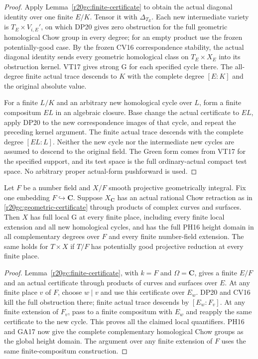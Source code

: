 \begin{proof}
Apply Lemma~\ref{r20gc:finite-certificate} to obtain the actual
diagonal identity over one finite $E/K$.  Tensor it with
$\Delta_{T_E}$.  Each new intermediate variety is
$T_E\times V_{i,E}'$, on which DP20 gives zero obstruction
for the full geometric homological Chow group in every
degree; for an empty product use the frozen potentially-good
case.  By the frozen CV16 correspondence stability, the
actual diagonal identity sends every geometric homological
class on $T_E\times X_E$ into its obstruction kernel.
VT17 gives strong G for each specified cycle there.
The all-degree finite actual trace descends to $K$ with
the complete degree $[E:K]$ and the original absolute value.

For a finite $L/K$ and an arbitrary new homological cycle
over $L$, form a finite compositum $EL$ in an algebraic
closure.  Base change the actual certificate to $EL$,
apply DP20 to the new correspondence images of that cycle,
and repeat the preceding kernel argument.  The finite
actual trace descends with the complete degree $[EL:L]$.
Neither the new cycle nor the intermediate new cycles are
assumed to descend to the original field.  The Green form
comes from VT17 for the specified support, and its test
space is the full ordinary-actual compact test space.
No arbitrary proper actual-form pushforward is used.
\end{proof}

\begin{theorem}
\label{r20gc:global}
Let $F$ be a number field and $X/F$ smooth projective
geometrically integral.  Fix one embedding $F\hookrightarrow
\mathbf C$.  Suppose $X_{\mathbf C}$ has an actual rational
Chow retraction as in \eqref{r20gc:geometric-certificate}
through products of complex curves and surfaces.
Then $X$ has full local G at every finite place, including
every finite local extension and all new homological cycles,
and has the full PH16 height domain in all complementary
degrees over $F$ and every finite number-field extension.
The same holds for $T\times X$ if $T/F$ has potentially
good projective reduction at every finite place.
\end{theorem}

\begin{proof}
Lemma~\ref{r20gc:finite-certificate}, with $k=F$ and
$\Omega=\mathbf C$, gives a finite $E/F$ and an actual
certificate through products of curves and surfaces over
$E$.  At any finite place $v$ of $F$, choose $w\mid v$
and use this certificate over $E_w$.  DP20 and CV16 kill
the full obstruction there; finite actual trace descends
by $[E_w:F_v]$.  At any finite extension of $F_v$, pass
to a finite compositum with $E_w$ and reapply the same
certificate to the new cycle.  This proves all the claimed
local quantifiers.  PH16 and GA17 now give the complete
complementary homological Chow groups as the global height
domain.  The argument over any finite extension of $F$
uses the same finite-compositum construction.
\end{proof}

